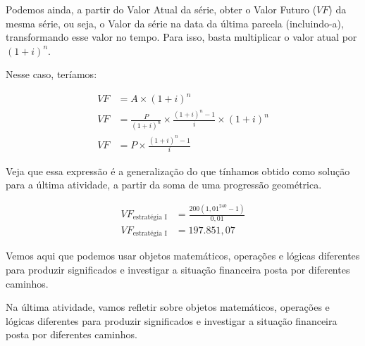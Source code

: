 \begin{reflection}
Podemos ainda, a partir do Valor Atual da série, obter o Valor Futuro ($\mathit{VF}$) da mesma série, ou seja, o Valor da série na data da última parcela (incluindo-a), transformando esse valor no tempo. Para isso, basta multiplicar o valor atual por $(1+i)^n$.

Nesse caso, teríamos:


\begin{align*}
\mathit{VF}&=A\times(1+i)^n\\
\mathit{VF}&=\frac{P}{(1+i)^n}\times\frac{(1+i)^n-1}{i}\times(1+i)^n\\
\mathit{VF}& =P\times\frac{(1+i)^n-1}{i}
\end{align*}



Veja que essa expressão é a generalização do que tínhamos obtido como solução para a última atividade, a partir da soma de uma progressão geométrica.

\begin{align*}
\mathit{VF}_{\text{estratégia I}}&=\frac{200(1{,}01^{240}-1)}{0{,}01}\\
\mathit{VF}_{\text{estratégia I}}&=197.851{,}07
\end{align*}

Vemos aqui que podemos usar objetos matemáticos, operações e lógicas diferentes para produzir significados e investigar a situação financeira posta por diferentes caminhos.

Na última atividade, vamos refletir sobre objetos matemáticos, operações e lógicas diferentes para produzir significados e investigar a situação financeira posta por diferentes caminhos.
\end{reflection}
\clearpage


